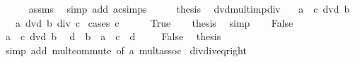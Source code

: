\begin{isabellebody}
\ \ \ \ \isamarkupfalse%
\ assms\ \isamarkupfalse%
\ {\isacharparenleft}{\kern0pt}simp\ add{\isacharcolon}{\kern0pt}\ ac{\isacharunderscore}{\kern0pt}simps{\isacharparenright}{\kern0pt}\isanewline
\ \ \isamarkupfalse%
\ \isamarkupfalse%
\ {\isacharquery}{\kern0pt}thesis\ \isacommand{{\isachardot}{\kern0pt}}\isamarkupfalse%
\isanewline
{}\isamarkupfalse%
%
\endisatagproof
{\isafoldproof}%
%
\isadelimproof
\isanewline
%
\endisadelimproof
\isanewline
{}\isamarkupfalse%
\ dvd{\isacharunderscore}{\kern0pt}mult{\isacharunderscore}{\kern0pt}imp{\isacharunderscore}{\kern0pt}div{\isacharcolon}{\kern0pt}\isanewline
\ \ \ {\isachardoublequoteopen}a\ {\isacharasterisk}{\kern0pt}\ c\ dvd\ b{\isachardoublequoteclose}\isanewline
\ \ \ {\isachardoublequoteopen}a\ dvd\ b\ div\ c{\isachardoublequoteclose}\isanewline
%
\isadelimproof
%
\endisadelimproof
%
\isatagproof
{}\isamarkupfalse%
\ {\isacharparenleft}{\kern0pt}cases\ {\isachardoublequoteopen}c\ {\isacharequal}{\kern0pt}\ {}{\isachardoublequoteclose}{\isacharparenright}{\kern0pt}\isanewline
\ \ \isamarkupfalse%
\ True\ \isamarkupfalse%
\ \isamarkupfalse%
\ {\isacharquery}{\kern0pt}thesis\ \isamarkupfalse%
\ simp\isanewline
{}\isamarkupfalse%
\isanewline
\ \ \isamarkupfalse%
\ False\isanewline
\ \ \isamarkupfalse%
\ {\isacartoucheopen}a\ {\isacharasterisk}{\kern0pt}\ c\ dvd\ b{\isacartoucheclose}\ \isamarkupfalse%
\ d\ \ {\isachardoublequoteopen}b\ {\isacharequal}{\kern0pt}\ a\ {\isacharasterisk}{\kern0pt}\ c\ {\isacharasterisk}{\kern0pt}\ d{\isachardoublequoteclose}\ \isacommand{{\isachardot}{\kern0pt}{\isachardot}{\kern0pt}}\isamarkupfalse%
\isanewline
\ \ \isamarkupfalse%
\ False\ \isamarkupfalse%
\ {\isacharquery}{\kern0pt}thesis\isanewline
\ \ \ \ \isamarkupfalse%
\ {\isacharparenleft}{\kern0pt}simp\ add{\isacharcolon}{\kern0pt}\ mult{\isachardot}{\kern0pt}commute\ {\isacharbrackleft}{\kern0pt}of\ a{\isacharbrackright}{\kern0pt}\ mult{\isachardot}{\kern0pt}assoc{\isacharparenright}{\kern0pt}\isanewline
{}\isamarkupfalse%
%
\endisatagproof
{\isafoldproof}%
%
\isadelimproof
\isanewline
%
\endisadelimproof
\isanewline
{}\isamarkupfalse%
\ div{\isacharunderscore}{\kern0pt}div{\isacharunderscore}{\kern0pt}eq{\isacharunderscore}{\kern0pt}right{\isacharcolon}{\kern0pt}\isanewline

\end{isabellebody}
